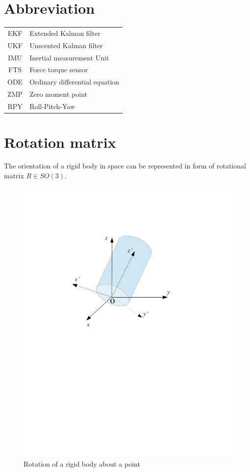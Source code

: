 \section{Abbreviation}
\begin{tabular}{c l}
EKF & Extended Kalman filter \\
UKF & Unscented Kalman filter \\
IMU & Inertial measurement Unit \\
FTS & Force torque sensor \\
ODE & Ordinary differential equation\\
ZMP & Zero moment point\\
RPY & Roll-Pitch-Yaw
\end{tabular}

\section{Rotation matrix}
\label{sec:rot_mat}
The orientation of a rigid body in space can be represented in form of rotational matrix $R \in SO(3)$. 
\begin{figure}
    \centering
    \includegraphics[trim = 5cm 13cm 5cm 5cm, scale = 0.65]{Bilder/rot_ab.pdf}
    \caption{Rotation of a rigid body about a point}
    \label{fig:rot_ab}
\end{figure}
